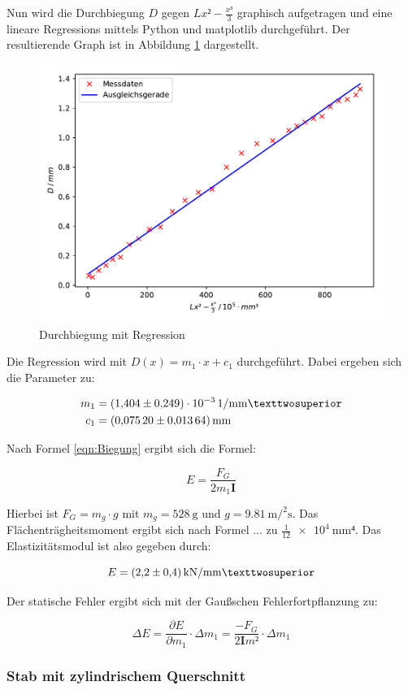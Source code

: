 Nun wird die Durchbiegung $D$ gegen $Lx²-\frac{x³}{3}$ graphisch aufgetragen
und eine lineare Regressions mittels Python und matplotlib durchgeführt.
Der resultierende Graph ist in Abbildung \ref{fig:plot1} dargestellt.

\begin{figure}
  \centering
  \includegraphics[scale=0.8]{content/plot1.pdf}
  \caption{Durchbiegung mit Regression}
  \label{fig:plot1}
\end{figure}

Die Regression wird mit $D(x) = m_1\cdot x + c_1$ durchgeführt. Dabei ergeben 
sich die Parameter zu: 

\begin{align*}
m_1 &= \SI{1.404+-0.249e-3}{1\per\milli\meter²}\\
c_1 &= \SI{0.0752+-0.01364}{\milli\meter}
\end{align*}

Nach Formel \eqref{eqn:Biegung} ergibt sich die Formel: 

\begin{equation*}
E = \frac{F_G}{2m_1\symbf{I}}
\end{equation*}

Hierbei ist $F_G = m_g\cdot g$ mit $m_g = \SI{528}{\gram}$ und 
$g = \SI{9.81}{\meter\per\squared\second}$. Das Flächenträgheitsmoment
ergibt sich nach Formel ... zu $\frac{1}{12} \SI{e4}{\milli\meter⁴}$. 
Das Elastizitätsmodul ist also gegeben durch: 

\begin{equation*}
E = \SI{2.2+-0.4}{\kilo\newton\per\milli\meter²}
\end{equation*}

Der statische Fehler ergibt sich mit der Gaußschen Fehlerfortpflanzung zu: 

\begin{equation*}
\Delta E = \frac{\partial E}{\partial m_1}\cdot \Delta m_1 
= \frac{-F_G}{2\symbf{I}m²} \cdot \Delta m_1
\end{equation*}


\subsubsection{Stab mit zylindrischem Querschnitt}